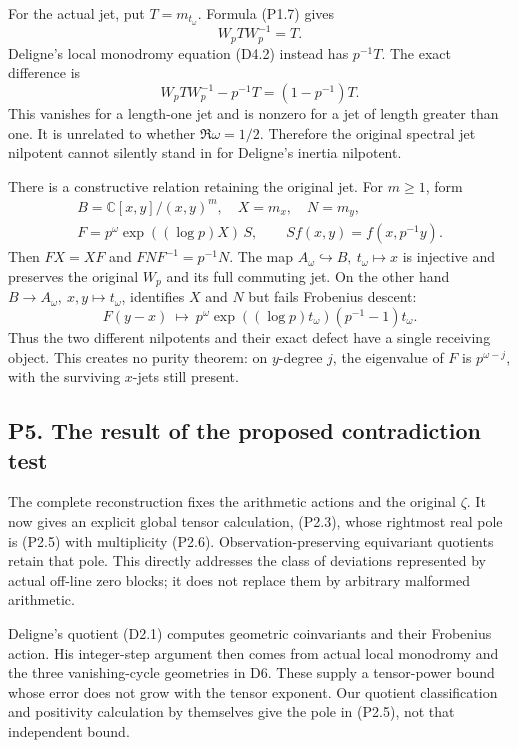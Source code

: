 For the actual jet, put \(T=m_{t_\omega}\). Formula (P1.7) gives \[
W_pTW_p^{-1}=T.
\tag{P4.3}
\] Deligne's local monodromy equation (D4.2) instead has \(p^{-1}T\).
The exact difference is \[
W_pTW_p^{-1}-p^{-1}T=(1-p^{-1})T.
\tag{P4.4}
\] This vanishes for a length-one jet and is nonzero for a jet of length
greater than one. It is unrelated to whether \(\Re\omega=1/2\).
Therefore the original spectral jet nilpotent cannot silently stand in
for Deligne's inertia nilpotent.

There is a constructive relation retaining the original jet. For
\(m\ge1\), form \[
\begin{gathered}
B=\mathbb C[x,y]/(x,y)^m,\quad X=m_x,\quad N=m_y,\\
F=p^\omega\exp((\log p)X)\,S,\qquad
S f(x,y)=f(x,p^{-1}y).
\end{gathered}
\tag{P4.5}
\] Then \(FX=XF\) and \(FNF^{-1}=p^{-1}N\). The map
\(A_\omega\hookrightarrow B,\ t_\omega\mapsto x\) is injective and
preserves the original \(W_p\) and its full commuting jet. On the other
hand \(B\to A_\omega,\ x,y\mapsto t_\omega\), identifies \(X\) and \(N\)
but fails Frobenius descent: \[
F(y-x)\ \mapsto\
p^\omega\exp((\log p)t_\omega)(p^{-1}-1)t_\omega.
\tag{P4.6}
\] Thus the two different nilpotents and their exact defect have a
single receiving object. This creates no purity theorem: on \(y\)-degree
\(j\), the eigenvalue of \(F\) is \(p^{\omega-j}\), with the surviving
\(x\)-jets still present.

\subsection{P5. The result of the proposed contradiction
test}\label{p5.-the-result-of-the-proposed-contradiction-test}

The complete reconstruction fixes the arithmetic actions and the
original \(\zeta\). It now gives an explicit global tensor calculation,
(P2.3), whose rightmost real pole is (P2.5) with multiplicity (P2.6).
Observation-preserving equivariant quotients retain that pole. This
directly addresses the class of deviations represented by actual
off-line zero blocks; it does not replace them by arbitrary malformed
arithmetic.

Deligne's quotient (D2.1) computes geometric coinvariants and their
Frobenius action. His integer-step argument then comes from actual local
monodromy and the three vanishing-cycle geometries in D6. These supply a
tensor-power bound whose error does not grow with the tensor exponent.
Our quotient classification and positivity calculation by themselves
give the pole in (P2.5), not that independent bound.

